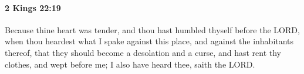 
		\paragraph{2 Kings 22:19} %
			\label{2KINGS-22-19}

			Because thine heart was tender, and thou hast humbled thyself before the LORD, when thou heardest what I spake against this place, and against the inhabitants thereof, that they should become a desolation and a curse, and hast rent thy clothes, and wept before me; I also have heard thee, saith the LORD.


